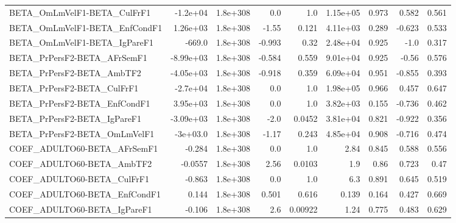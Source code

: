 \begin{tabular}{lrrrrrrrr}
BETA\_OmLmVelF1-BETA\_CulFrF1           &    -1.2e+04 &     1.8e+308 &     0.0 &      1.0 &   1.15e+05 &       0.973 &        0.582 &         0.561 \\
BETA\_OmLmVelF1-BETA\_EnfCondF1         &    1.26e+03 &     1.8e+308 &   -1.55 &    0.121 &   4.11e+03 &       0.289 &       -0.623 &         0.533 \\
BETA\_OmLmVelF1-BETA\_IgPareF1          &      -669.0 &     1.8e+308 &  -0.993 &     0.32 &   2.48e+04 &       0.925 &         -1.0 &         0.317 \\
BETA\_PrPersF2-BETA\_AFrSemF1           &   -8.99e+03 &     1.8e+308 &  -0.584 &    0.559 &   9.01e+04 &       0.925 &        -0.56 &         0.576 \\
BETA\_PrPersF2-BETA\_AmbTF2             &   -4.05e+03 &     1.8e+308 &  -0.918 &    0.359 &   6.09e+04 &       0.951 &       -0.855 &         0.393 \\
BETA\_PrPersF2-BETA\_CulFrF1            &    -2.7e+04 &     1.8e+308 &     0.0 &      1.0 &   1.98e+05 &       0.966 &        0.457 &         0.647 \\
BETA\_PrPersF2-BETA\_EnfCondF1          &    3.95e+03 &     1.8e+308 &     0.0 &      1.0 &   3.82e+03 &       0.155 &       -0.736 &         0.462 \\
BETA\_PrPersF2-BETA\_IgPareF1           &   -3.09e+03 &     1.8e+308 &    -2.0 &   0.0452 &   3.81e+04 &       0.821 &       -0.922 &         0.356 \\
BETA\_PrPersF2-BETA\_OmLmVelF1          &    -3e+03.0 &     1.8e+308 &   -1.17 &    0.243 &   4.85e+04 &       0.908 &       -0.716 &         0.474 \\
COEF\_ADULTO60-BETA\_AFrSemF1           &      -0.284 &     1.8e+308 &     0.0 &      1.0 &       2.84 &       0.845 &        0.588 &         0.556 \\
COEF\_ADULTO60-BETA\_AmbTF2             &     -0.0557 &     1.8e+308 &    2.56 &   0.0103 &        1.9 &        0.86 &        0.723 &          0.47 \\
COEF\_ADULTO60-BETA\_CulFrF1            &      -0.863 &     1.8e+308 &     0.0 &      1.0 &        6.3 &       0.891 &        0.645 &         0.519 \\
COEF\_ADULTO60-BETA\_EnfCondF1          &       0.144 &     1.8e+308 &   0.501 &    0.616 &      0.139 &       0.164 &        0.427 &         0.669 \\
COEF\_ADULTO60-BETA\_IgPareF1           &      -0.106 &     1.8e+308 &     2.6 &  0.00922 &       1.24 &       0.775 &        0.483 &         0.629 \\

\end{tabular}
